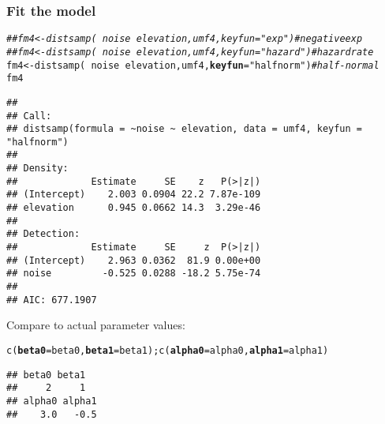 \documentclass[color=usenames,dvipsnames]{beamer}\usepackage[]{graphicx}\usepackage[]{xcolor}
\makeatletter
\newcommand{\hlstr}[1]{\textcolor[rgb]{0.749,0.012,0.012}{#1}}%
\newcommand{\hlcom}[1]{\textcolor[rgb]{0.514,0.506,0.514}{\textit{#1}}}%
\newcommand{\hlopt}[1]{\textcolor[rgb]{0,0,0}{#1}}%
\newcommand{\hlstd}[1]{\textcolor[rgb]{0,0,0}{#1}}%
\newcommand{\hlkwb}[1]{\textcolor[rgb]{0,0.341,0.682}{#1}}%
\newcommand{\hlkwc}[1]{\textcolor[rgb]{0,0,0}{\textbf{#1}}}%
\newcommand{\hlkwd}[1]{\textcolor[rgb]{0.004,0.004,0.506}{#1}}%
\newenvironment{kframe}{%
 \def\at@end@of@kframe{}%
 \ifinner\ifhmode%
  \def\at@end@of@kframe{\end{minipage}}%
  \begin{minipage}{\columnwidth}%
 \fi\fi%
 \def\FrameCommand##1{\hskip\@totalleftmargin \hskip-\fboxsep
 \colorbox{shadecolor}{##1}\hskip-\fboxsep
     \hskip-\linewidth \hskip-\@totalleftmargin \hskip\columnwidth}%
 \MakeFramed {\advance\hsize-\width
   \@totalleftmargin\z@ \linewidth\hsize
   \@setminipage}}%
 {\par\unskip\endMakeFramed%
 \at@end@of@kframe}
\newenvironment{knitrout}{}{} %
\makeatother
\begin{document}
\begin{frame}[fragile]
  \frametitle{Fit the model}
  \footnotesize
\begin{knitrout}\tiny
{}\color{fgcolor}\begin{kframe}
\begin{alltt}
\hlcom{## fm4 <- distsamp(~noise ~elevation, umf4, keyfun="exp")     # negative exp}
\hlcom{## fm4 <- distsamp(~noise ~elevation, umf4, keyfun="hazard")  # hazard rate}
\hlstd{fm4} \hlkwb{<-} \hlkwd{distsamp}\hlstd{(}\hlopt{~}\hlstd{noise} \hlopt{~}\hlstd{elevation, umf4,} \hlkwc{keyfun}\hlstd{=}\hlstr{"halfnorm"}\hlstd{)}   \hlcom{# half-normal}
\hlstd{fm4}
\end{alltt}
\begin{verbatim}
## 
## Call:
## distsamp(formula = ~noise ~ elevation, data = umf4, keyfun = "halfnorm")
## 
## Density:
##             Estimate     SE    z   P(>|z|)
## (Intercept)    2.003 0.0904 22.2 7.87e-109
## elevation      0.945 0.0662 14.3  3.29e-46
## 
## Detection:
##             Estimate     SE     z  P(>|z|)
## (Intercept)    2.963 0.0362  81.9 0.00e+00
## noise         -0.525 0.0288 -18.2 5.75e-74
## 
## AIC: 677.1907
\end{verbatim}
\end{kframe}
\end{knitrout}
\pause
\vfill
Compare to actual parameter values:
\vspace{-6pt}
\begin{knitrout}\tiny
{}\color{fgcolor}\begin{kframe}
\begin{alltt}
\hlkwd{c}\hlstd{(}\hlkwc{beta0}\hlstd{=beta0,} \hlkwc{beta1}\hlstd{=beta1);} \hlkwd{c}\hlstd{(}\hlkwc{alpha0}\hlstd{=alpha0,} \hlkwc{alpha1}\hlstd{=alpha1)}
\end{alltt}
\begin{verbatim}
## beta0 beta1 
##     2     1
## alpha0 alpha1 
##    3.0   -0.5
\end{verbatim}
\end{kframe}
\end{knitrout}
\end{frame}
\end{document}
